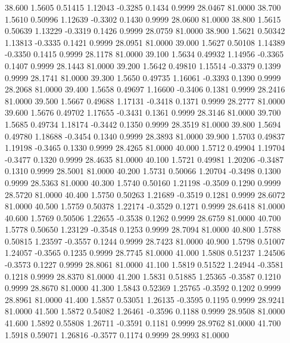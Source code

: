   38.600   1.5605   0.51415   1.12043  -0.3285   0.1434   0.9999  28.0467  81.0000
  38.700   1.5610   0.50996   1.12639  -0.3302   0.1430   0.9999  28.0600  81.0000
  38.800   1.5615   0.50639   1.13229  -0.3319   0.1426   0.9999  28.0759  81.0000
  38.900   1.5621   0.50342   1.13813  -0.3335   0.1421   0.9999  28.0951  81.0000
  39.000   1.5627   0.50108   1.14389  -0.3350   0.1415   0.9999  28.1178  81.0000
  39.100   1.5634   0.49932   1.14956  -0.3365   0.1407   0.9999  28.1443  81.0000
  39.200   1.5642   0.49810   1.15514  -0.3379   0.1399   0.9999  28.1741  81.0000
  39.300   1.5650   0.49735   1.16061  -0.3393   0.1390   0.9999  28.2068  81.0000
  39.400   1.5658   0.49697   1.16600  -0.3406   0.1381   0.9999  28.2416  81.0000
  39.500   1.5667   0.49688   1.17131  -0.3418   0.1371   0.9999  28.2777  81.0000
  39.600   1.5676   0.49702   1.17655  -0.3431   0.1361   0.9999  28.3146  81.0000
  39.700   1.5685   0.49734   1.18174  -0.3442   0.1350   0.9999  28.3519  81.0000
  39.800   1.5694   0.49780   1.18688  -0.3454   0.1340   0.9999  28.3893  81.0000
  39.900   1.5703   0.49837   1.19198  -0.3465   0.1330   0.9999  28.4265  81.0000
  40.000   1.5712   0.49904   1.19704  -0.3477   0.1320   0.9999  28.4635  81.0000
  40.100   1.5721   0.49981   1.20206  -0.3487   0.1310   0.9999  28.5001  81.0000
  40.200   1.5731   0.50066   1.20704  -0.3498   0.1300   0.9999  28.5363  81.0000
  40.300   1.5740   0.50160   1.21198  -0.3509   0.1290   0.9999  28.5720  81.0000
  40.400   1.5750   0.50263   1.21689  -0.3519   0.1281   0.9999  28.6072  81.0000
  40.500   1.5759   0.50378   1.22174  -0.3529   0.1271   0.9999  28.6418  81.0000
  40.600   1.5769   0.50506   1.22655  -0.3538   0.1262   0.9999  28.6759  81.0000
  40.700   1.5778   0.50650   1.23129  -0.3548   0.1253   0.9999  28.7094  81.0000
  40.800   1.5788   0.50815   1.23597  -0.3557   0.1244   0.9999  28.7423  81.0000
  40.900   1.5798   0.51007   1.24057  -0.3565   0.1235   0.9999  28.7745  81.0000
  41.000   1.5808   0.51237   1.24506  -0.3573   0.1227   0.9999  28.8061  81.0000
  41.100   1.5819   0.51522   1.24944  -0.3581   0.1218   0.9999  28.8370  81.0000
  41.200   1.5831   0.51885   1.25365  -0.3587   0.1210   0.9999  28.8670  81.0000
  41.300   1.5843   0.52369   1.25765  -0.3592   0.1202   0.9999  28.8961  81.0000
  41.400   1.5857   0.53051   1.26135  -0.3595   0.1195   0.9999  28.9241  81.0000
  41.500   1.5872   0.54082   1.26461  -0.3596   0.1188   0.9999  28.9508  81.0000
  41.600   1.5892   0.55808   1.26711  -0.3591   0.1181   0.9999  28.9762  81.0000
  41.700   1.5918   0.59071   1.26816  -0.3577   0.1174   0.9999  28.9993  81.0000
